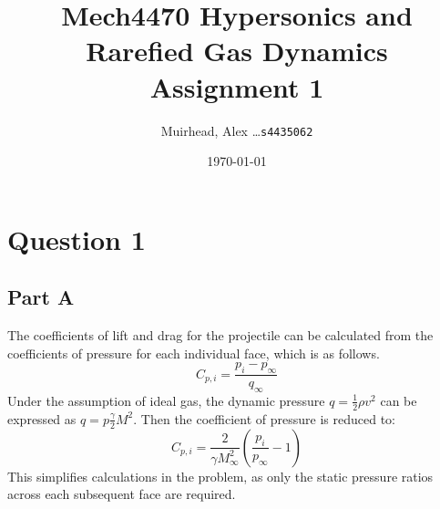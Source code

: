 \documentclass[a4paper]{article}
\title{
	\Large {\sc Mech}4470 Hypersonics and Rarefied Gas Dynamics\\
	\Huge Assignment 1
}
\author{Muirhead, Alex \dots \texttt{s4435062}}
\date{\today}
\begin{document}
\maketitle


\vspace{10em}

\newpage
{}

\section*{Question 1}

\subsection*{Part A}
The coefficients of lift and drag for the projectile can be calculated from the coefficients of pressure for each individual face, which is as follows.
\begin{equation*}
	C_{p,i} = \frac{p_i - p_\infty}{q_\infty}
\end{equation*}
Under the assumption of ideal gas, the dynamic pressure \(q = {\frac{1}{2}\rho v^2}\) can be expressed as \(q = p\frac{\gamma}{2}M^2\). Then the coefficient of pressure is reduced to:
\begin{equation*}
	C_{p,i} = \frac{2}{\gamma M_\infty^2} \left( \frac{p_i}{p_\infty} - 1 \right)
\end{equation*}
This simplifies calculations in the problem, as only the static pressure ratios across each subsequent face are required.
\end{document}
